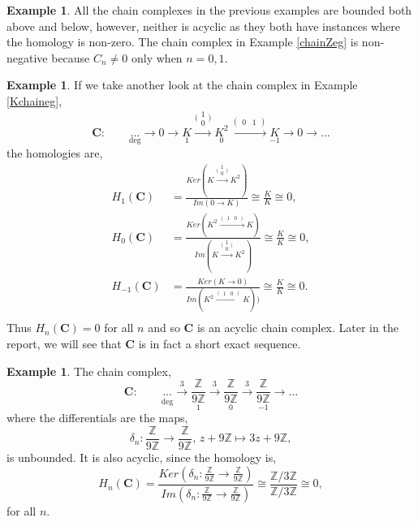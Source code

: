 \documentclass[11.5pt, twoside, a4paper, titlepage]{report}
\providecommand{\equ}[0]{\begin{equation*}}
\providecommand{\eequ}[0] {\end{equation*}}
\providecommand{\bb}[1]{\mathbb{#1}}
\theoremstyle{definition}
\newtheorem{eg}[mydef]{Example}
\theoremstyle{plain}
\begin{document}
\begin{eg}
All the chain complexes in the previous examples are bounded both above and below, however, neither is acyclic as they both have instances where the homology is non-zero. The chain complex in Example \ref{chainZeg} is non-negative because $C_n\neq 0$ only when $n=0,1$.
\end{eg}

\begin{eg}
If we take another look at the chain complex in Example \ref{Kchaineg},
\equ
\mathbf{C}: \qquad \underset{\text{deg}}{\dots} \xrightarrow{} 0 \xrightarrow{} \underset{1}{K} \xrightarrow{\big(\begin{smallmatrix} 1\\ 0 \end{smallmatrix}\big)} \underset{0}{K^2} \xrightarrow{(\begin{smallmatrix}0 & 1 \end{smallmatrix})}\underset{-1}{K} \xrightarrow{} 0 \xrightarrow{} \dots
\eequ
the homologies are, 
\begin{align*}
H_1(\mathbf{C}) &=\frac{Ker(K\xrightarrow{\big(\begin{smallmatrix} 1\\ 0 \end{smallmatrix}\big)}K^2)}{Im(0 \xrightarrow{}K)}\cong \frac{K}{K} \cong 0,\\
H_0(\mathbf{C}) &=\frac{Ker(K^2\xrightarrow{(\begin{smallmatrix} 1 & 0 \end{smallmatrix})}K)}{Im(K\xrightarrow{\big(\begin{smallmatrix} 1\\ 0 \end{smallmatrix}\big)}K^2)}\cong \frac{K}{K} \cong 0,\\
H_{-1}(\mathbf{C}) &=\frac{Ker(K\xrightarrow{}0)}{Im(K^2\xrightarrow{(\begin{smallmatrix} 1 & 0 \end{smallmatrix})}K))}\cong \frac{K}{K} \cong 0.\\
\end{align*}
Thus $H_n(\mathbf{C})=0$ for all $n$ and so $\mathbf{C}$ is an acyclic chain complex. Later in the report, we will see that $\mathbf{C}$ is in fact a short exact sequence.
\end{eg}

\begin{eg}
The chain complex,
\equ
\mathbf{C}: \qquad \underset{\text{deg}}{\underset{}{\dots}} \xrightarrow{3}\underset{1}{\frac{\bb{Z}}{9\bb{Z}}} \xrightarrow{3}\underset{0}{\frac{\bb{Z}}{9\bb{Z}}} \xrightarrow{3}\underset{-1}{\frac{\bb{Z}}{9\bb{Z}}} \xrightarrow{} \dots
\eequ
where the differentials are the maps,
\equ
\delta_n:\frac{\bb{Z}}{9\bb{Z}}\xrightarrow{}\frac{\bb{Z}}{9\bb{Z}}\text{, } z+9\bb{Z}\mapsto 3z+9\bb{Z},
\eequ
is unbounded. It is also acyclic, since the homology is,
\equ
H_n(\mathbf{C})=\frac{Ker(\delta_n:\frac{\bb{Z}}{9\bb{Z}}\xrightarrow{}\frac{\bb{Z}}{9\bb{Z}})}{Im(\delta_n:\frac{\bb{Z}}{9\bb{Z}}\xrightarrow{}\frac{\bb{Z}}{9\bb{Z}})}\cong \frac{\bb{Z}/3\bb{Z}}{\bb{Z}/3\bb{Z}} \cong 0, 
\eequ
for all $n$.
\end{eg}
\end{document}
